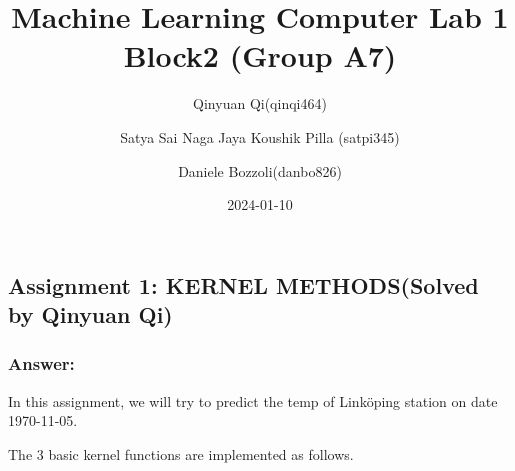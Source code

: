 \documentclass[
]{article}
\title{Machine Learning Computer Lab 1 Block2 (Group A7)}
\author{Qinyuan Qi(qinqi464) \and Satya Sai Naga Jaya Koushik Pilla
(satpi345) \and Daniele Bozzoli(danbo826)}
\date{2024-01-10}
\begin{document}
\maketitle

\subsection{Assignment 1: KERNEL METHODS(Solved by Qinyuan
Qi)}\label{assignment-1-kernel-methodssolved-by-qinyuan-qi}

\subsubsection{Answer:}\label{answer}

In this assignment, we will try to predict the temp of Linköping station
on date 1970-11-05.

The 3 basic kernel functions are implemented as follows.
\end{document}
